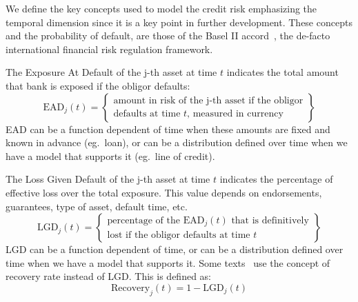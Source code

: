 \documentclass[11pt,fleqn]{book} %
\begin{document}
We define the key concepts used to model the credit risk emphasizing 
the temporal dimension since it is a key point in further development. 
These concepts and the probability of default, are those of the Basel II 
accord~\cite{basel2:2006}, the de-facto international financial risk 
regulation framework.

\begin{definition}
	The Exposure At Default of the j-th asset at time $t$ indicates 
	the total amount that bank is exposed if the obligor defaults:
	\begin{displaymath}
		\text{EAD}_j(t) = \left\{
		\begin{array}{c}
			\text{amount in risk of the j-th asset if the obligor} \\
			\text{defaults at time $t$, measured in currency}
		\end{array}
		\right\}
	\end{displaymath}
	EAD can be a function dependent of time when these amounts are
	fixed and known in advance (eg.\ loan), or can be a distribution
	defined over time when we have a model that supports it 
	(eg.\ line of credit).
\end{definition}

\begin{definition}
	The Loss Given Default of the j-th asset at time $t$ indicates 
	the percentage of effective loss over the total exposure. This
	value depends on endorsements, guarantees, type of asset, 
	default time, etc.
	\begin{displaymath}
		\text{LGD}_j(t) = \left\{
		\begin{array}{c}
			\text{percentage of the $\text{EAD}_j(t)$ that is definitively} \\
			\text{lost if the obligor defaults at time $t$}
		\end{array}
		\right\}
	\end{displaymath}
	LGD can be a function dependent of time, or can be a distribution
	defined over time when we have a model that supports it. 
	Some texts~\cite{creditrisk+:1997} use the concept of recovery rate
	instead of LGD\@. This is defined as:
	\begin{displaymath}
		\text{Recovery}_j(t) = 1- \text{LGD}_j(t)
	\end{displaymath}
\end{definition}
\end{document}
